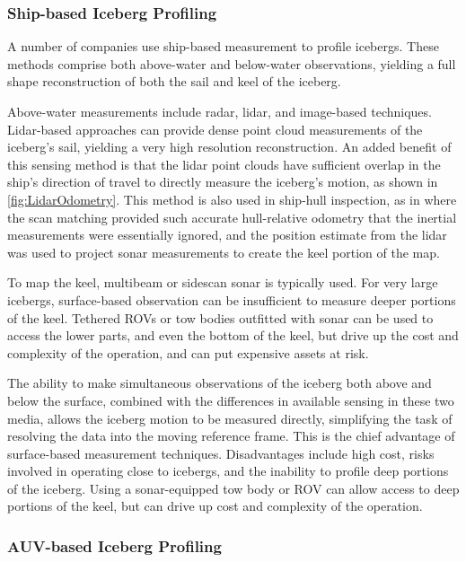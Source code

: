 \subsubsection{Ship-based Iceberg Profiling}

A number of companies use ship-based measurement to profile icebergs. These methods comprise both above-water and below-water observations, yielding a full shape reconstruction of both the sail and keel of the iceberg. 

Above-water measurements include radar, lidar, and image-based techniques. Lidar-based approaches can provide dense point cloud measurements of the iceberg's sail, yielding a very high resolution reconstruction. An added benefit of this sensing method is that the lidar point clouds have sufficient overlap in the ship's direction of travel to directly measure the iceberg's motion, as shown in \ref{fig:LidarOdometry}. This method is also used in ship-hull inspection, as in \cite{Papadopoulos2014} where the scan matching provided such accurate hull-relative odometry that the inertial measurements were essentially ignored, and the position estimate from the lidar was used to project sonar measurements to create the keel portion of the map.

To map the keel, multibeam or sidescan sonar is typically used. For very large icebergs, surface-based observation can be insufficient to measure deeper portions of the keel. Tethered ROVs or tow bodies outfitted with sonar can be used to access the lower parts, and even the bottom of the keel, but drive up the cost and complexity of the operation, and can put expensive assets at risk. 

The ability to make simultaneous observations of the iceberg both above and below the surface, combined with the differences in available sensing in these two media, allows the iceberg motion to be measured directly, simplifying the task of resolving the data into the moving reference frame. This is the chief advantage of surface-based measurement techniques. Disadvantages include high cost, risks involved in operating close to icebergs, and the inability to profile deep portions of the iceberg. Using a sonar-equipped tow body or ROV can allow access to deep portions of the keel, but can drive up cost and complexity of the operation. 


\subsubsection{AUV-based Iceberg Profiling}

